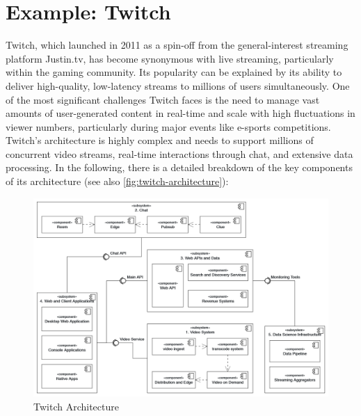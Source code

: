 \section{Example: Twitch}
Twitch, which launched in 2011 as a spin-off from the general-interest streaming platform Justin.tv, has become synonymous with live streaming, particularly within the gaming community. Its popularity can be explained by its ability to deliver high-quality, low-latency streams to millions of users simultaneously. 
One of the most significant challenges Twitch faces is the need to manage vast amounts of user-generated content in real-time and scale with high fluctuations in viewer numbers, particularly during major events like e-sports competitions.
Twitch's architecture is highly complex and needs to support millions of concurrent video streams, real-time interactions through chat, and extensive data processing. In the following, there is a detailed breakdown of the key components of its architecture (see also \autoref{fig:twitch-architecture}):

\begin{figure}[htpb]
    \centering
    \includegraphics[width=\linewidth]{images/TwitchArchitecture.png}
    \caption[Twitch Architecture]{Twitch Architecture}\label{fig:twitch-architecture}
\end{figure}

